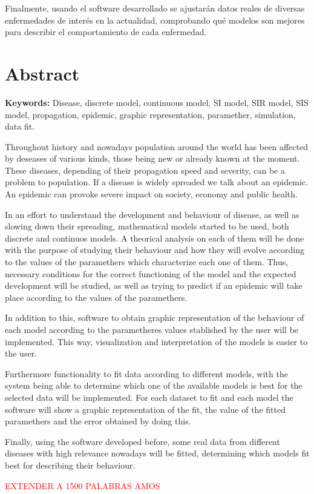 Finalmente, usando el software desarrollado se ajustarán datos reales de diversas enfermedades de interés en la actualidad, comprobando qué modelos son mejores para describir el comportamiento de cada enfermedad.



\chapter*{Abstract}

\textbf{Keywords: } Disease, discrete model, continuous model, SI model, SIR model, SIS model, propagation, epidemic, graphic representation, paramether, simulation, data fit.

Throughout history and nowadays population around the world has been affected by deseases of various kinds, those being new or already known at the moment. These diseases, depending of their propagation speed and severity, can be a problem to population. If a disease is widely spreaded we talk about an epidemic. An epidemic can provoke severe impact on society, economy and public health.

In an effort to understand the development and behaviour of disease, as well as slowing down their spreading, mathematical models started to be used, both discrete and continuos models. A theorical analysis on each of them will be done with the purpose of studying their behaviour and how they will evolve according to the values of the paramethers which characterize each one of them. Thus, necessary conditions for the correct functioning of the model and the expected development will be studied, as well as trying to predict if an epidemic will take place according to the values of the paramethers.

In addition to this, software  to obtain graphic representation of the behaviour of each model according to the parametheres values stablished by the user will be implemented. This way, visualization and interpretation of the models is easier to the user.

Furthermore functionality to fit data according to different models, with the system being able to determine which one of the available models is best for the selected data will be implemented. For each dataset to fit and each model the software will show a graphic representation of the fit, the value of the fitted paramethers and the error obtained by doing this.

Finally, using the software developed before, some real data from different diseases with high relevance nowadays will be fitted, determining which models fit best for describing their behaviour.

\textcolor{red}{EXTENDER A 1500 PALABRAS AMOS}

